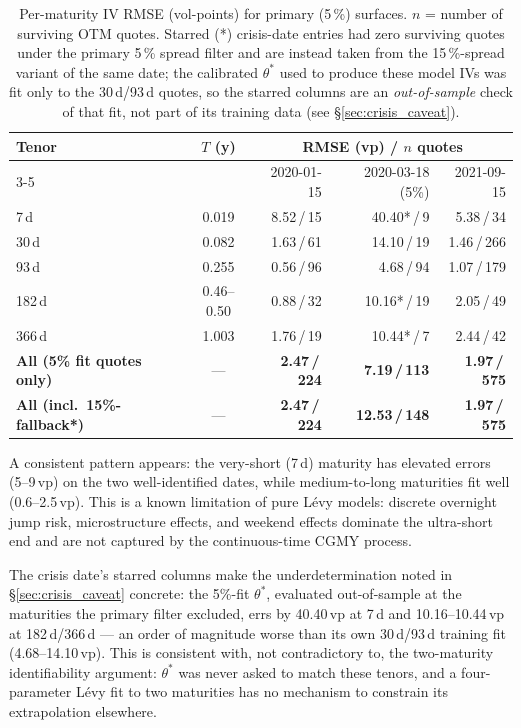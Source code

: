 \documentclass[11pt,a4paper]{article}
\begin{document}
\begin{table}[ht]
\centering
\caption{Per-maturity IV RMSE (vol-points) for primary (5\,\%) surfaces.
  $n$ = number of surviving OTM quotes.
  Starred (*) crisis-date entries had zero surviving quotes under the
  primary 5\,\% spread filter and are instead taken from the 15\,\%-spread
  variant of the same date; the calibrated $\theta^*$ used to produce
  these model IVs was fit only to the 30\,d/93\,d quotes, so the starred
  columns are an \emph{out-of-sample} check of that fit, not part of its
  training data (see \S\ref{sec:crisis_caveat}).}
\label{tab:per_maturity}
\setlength{\tabcolsep}{6pt}
\begin{tabular}{lcrrr}
\toprule
\multirow{2}{*}{Tenor} & \multirow{2}{*}{$T$ (y)}
  & \multicolumn{3}{c}{RMSE (vp) / $n$ quotes} \\
\cmidrule(lr){3-5}
& & 2020-01-15 & 2020-03-18 (5\%) & 2021-09-15 \\
\midrule
 7\,d  & 0.019 & 8.52\,/\,15  & 40.40*\,/\,9      & 5.38\,/\,34  \\
30\,d  & 0.082 & 1.63\,/\,61  & 14.10\,/\,19      & 1.46\,/\,266 \\
93\,d  & 0.255 & 0.56\,/\,96  &  4.68\,/\,94      & 1.07\,/\,179 \\
182\,d & 0.46--0.50 & 0.88\,/\,32 & 10.16*\,/\,19  & 2.05\,/\,49 \\
366\,d & 1.003 & 1.76\,/\,19  & 10.44*\,/\,7       & 2.44\,/\,42  \\
\midrule
\textbf{All (5\% fit quotes only)} & —
  & \textbf{2.47\,/\,224} & \textbf{7.19\,/\,113}
  & \textbf{1.97\,/\,575} \\
\textbf{All (incl.\ 15\%-fallback*)} & —
  & \textbf{2.47\,/\,224} & \textbf{12.53\,/\,148}
  & \textbf{1.97\,/\,575} \\
\bottomrule
\end{tabular}
\end{table}

A consistent pattern appears: the very-short (7\,d) maturity has elevated
errors (5--9\,vp) on the two well-identified dates, while medium-to-long
maturities fit well (0.6--2.5\,vp).
This is a known limitation of pure L\'{e}vy models: discrete overnight
jump risk, microstructure effects, and weekend effects dominate the
ultra-short end and are not captured by the continuous-time CGMY process.

The crisis date's starred columns make the underdetermination noted in
\S\ref{sec:crisis_caveat} concrete: the 5\%-fit $\theta^*$, evaluated
out-of-sample at the maturities the primary filter excluded, errs by
40.40\,vp at 7\,d and 10.16--10.44\,vp at 182\,d/366\,d — an order of
magnitude worse than its own 30\,d/93\,d training fit (4.68--14.10\,vp).
This is consistent with, not contradictory to, the two-maturity
identifiability argument: $\theta^*$ was never asked to match these
tenors, and a four-parameter Lévy fit to two maturities has no mechanism
to constrain its extrapolation elsewhere.
\end{document}
